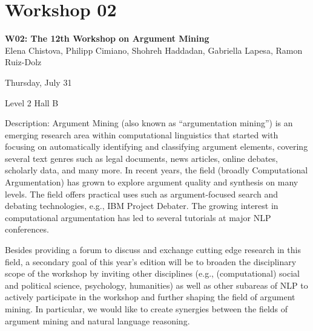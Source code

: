 \clearpage



\section[W02: The 12th Workshop on Argument Mining]{Workshop 02}
\label{workshop_2}

\begin{center}
    {\Large \textbf{W02: The 12th Workshop on Argument Mining}}\\
    

    Elena Chistova, Philipp Cimiano, Shohreh Haddadan, Gabriella Lapesa, Ramon Ruiz-Dolz                                                                                                                                                                                                

    Thursday, July 31
    
    Level 2 Hall B

\end{center}
	
Description: Argument Mining (also known as “argumentation mining”) is an emerging research area within computational linguistics that started with focusing on automatically identifying and classifying argument elements, covering several text genres such as legal documents, news articles, online debates, scholarly data, and many more. In recent years, the field (broadly Computational Argumentation) has grown to explore argument quality and synthesis on many levels. The field offers practical uses such as argument-focused search and debating technologies, e.g., IBM Project Debater. The growing interest in computational argumentation has led to several tutorials at major NLP conferences.

Besides providing a forum to discuss and exchange cutting edge research in this field, a secondary goal of this year's edition will be to broaden the disciplinary scope of the workshop by inviting other disciplines (e.g., (computational) social and political science, psychology, humanities) as well as other subareas of NLP to actively participate in the workshop and further shaping the field of argument mining. In particular, we would like to create synergies between the fields of argument mining and natural language reasoning.	
